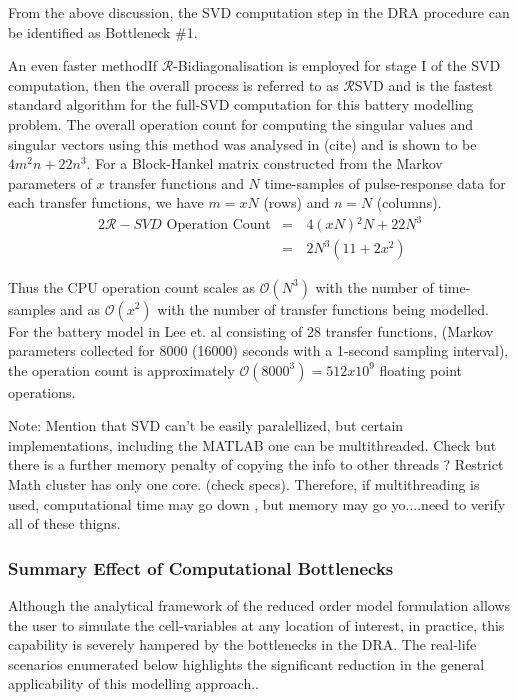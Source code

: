 From the above discussion, the SVD computation step in the DRA procedure
can be identified as Bottleneck \#1.


An even faster methodIf $\mathcal{R}$-Bidiagonalisation is employed
for stage I of the SVD computation, then the overall process is referred
to as $\mathcal{R}$\textminus SVD and is the fastest standard algorithm
for the full-SVD computation for this battery modelling problem. The
overall operation count for computing the singular values and singular
vectors using this method was analysed in (cite) and is shown to be
$4m^{2}n+22n^{3}$. For a Block-Hankel matrix constructed from the
Markov parameters of $x$ transfer functions and $N$ time-samples
of pulse-response data for each transfer functions, we have $m=xN$
(rows) and $n=N$ (columns).
\begin{alignat*}{2}
\mathcal{R}-SVD\text{ Operation Count} & = & \,4\left(xN\right){}^{2}N+22N^{3}\\
 & = & \,2N^{3}\left(11+2x^{2}\right)
\end{alignat*}

Thus the CPU operation count scales as $\mathcal{O}(N^{3})$ with
the number of time-samples and as $\mathcal{O}(x^{2})$ with the number
of transfer functions being modelled. For the battery model in Lee
et. al consisting of 28 transfer functions, (Markov parameters collected
for 8000 (16000) seconds with a 1-second sampling interval), the operation
count is approximately $\mathcal{O}(8000^{3})=512x10^{9}$ floating
point operations.

Note: Mention that SVD can't be easily paralellized, but certain implementations,
including the MATLAB one can be multithreaded. Check but there is
a further memory penalty of copying the info to other threads ? Restrict
Math cluster has only one core. (check specs). Therefore, if multithreading
is used, computational time may go down , but memory may go yo....need
to verify all of these thigns.

\subsubsection{Summary Effect of Computational Bottlenecks}

Although the analytical framework of the reduced order model formulation
allows the user to simulate the cell-variables at any location of
interest, in practice, this capability is severely hampered by the
bottlenecks in the DRA. The real-life scenarios enumerated below highlights
the significant reduction in the general applicability of this modelling
approach..


